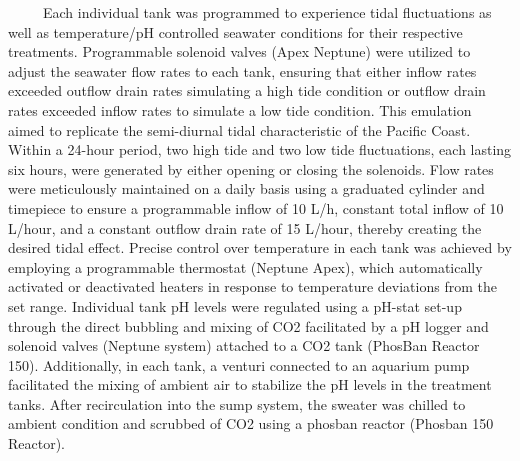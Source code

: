\documentclass[
]{article}
\begin{document}
~~~~~Each individual tank was programmed to experience tidal
fluctuations as well as temperature/pH controlled seawater conditions
for their respective treatments. Programmable solenoid valves (Apex
Neptune) were utilized to adjust the seawater flow rates to each tank,
ensuring that either inflow rates exceeded outflow drain rates
simulating a high tide condition or outflow drain rates exceeded inflow
rates to simulate a low tide condition. This emulation aimed to
replicate the semi-diurnal tidal characteristic of the Pacific Coast.
Within a 24-hour period, two high tide and two low tide fluctuations,
each lasting six hours, were generated by either opening or closing the
solenoids. Flow rates were meticulously maintained on a daily basis
using a graduated cylinder and timepiece to ensure a programmable inflow
of 10 L/h, constant total inflow of 10 L/hour, and a constant outflow
drain rate of 15 L/hour, thereby creating the desired tidal effect.
Precise control over temperature in each tank was achieved by employing
a programmable thermostat (Neptune Apex), which automatically activated
or deactivated heaters in response to temperature deviations from the
set range. Individual tank pH levels were regulated using a pH-stat
set-up through the direct bubbling and mixing of CO2 facilitated by a pH
logger and solenoid valves (Neptune system) attached to a CO2 tank
(PhosBan Reactor 150). Additionally, in each tank, a venturi connected
to an aquarium pump facilitated the mixing of ambient air to stabilize
the pH levels in the treatment tanks. After recirculation into the sump
system, the sweater was chilled to ambient condition and scrubbed of CO2
using a phosban reactor (Phosban 150 Reactor).
\end{document}

